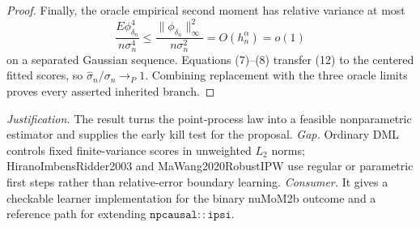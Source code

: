 \documentclass{article}
\begin{document}
\begin{proof}
Finally, the oracle empirical second moment has relative variance at most
\[
 \frac{E\phi_{\delta_n}^4}{n\sigma_n^4}
 \leq\frac{\|\phi_{\delta_n}\|_\infty^2}{n\sigma_n^2}
 =O(h_n^\alpha)=o(1) \tag{12}
\]
on a separated Gaussian sequence.  Equations (7)--(8) transfer (12) to the centered fitted scores, so \(\widehat\sigma_n/\sigma_n\to_P1\).  Combining replacement with the three oracle limits proves every asserted inherited branch.
\end{proof}
\par\smallskip\noindent \textit{Justification.} The result turns the point-process law into a feasible nonparametric estimator and supplies the early kill test for the proposal. \textit{Gap.} Ordinary DML controls fixed finite-variance scores in unweighted \(L_2\) norms; HiranoImbensRidder2003 and MaWang2020RobustIPW use regular or parametric first steps rather than relative-error boundary learning. \textit{Consumer.} It gives a checkable learner implementation for the binary nuMoM2b outcome and a reference path for extending \(\mathtt{npcausal::ipsi}\).
\end{document}
